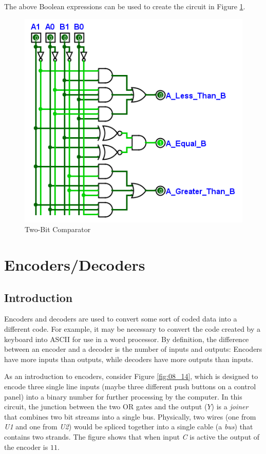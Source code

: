 The above Boolean expressions can be used to create the circuit in Figure \ref{fig:08_13}.

\begin{figure}[H]
	\centering
	\includegraphics[width=\maxwidth{.95\linewidth}]{gfx/08_13}
	\caption{Two-Bit Comparator}
	\label{fig:08_13}
\end{figure}

\section{Encoders/Decoders}
\label{CL:sec:encoders_decoders}

\subsection{Introduction}
\label{CL:subsec:introduction_to_encoders_decoders}

Encoders and decoders are used to convert some sort of coded data into a different code. For example, it may be necessary to convert the code created by a keyboard into \ac{ASCII} for use in a word processor. By definition, the difference between an encoder and a decoder is the number of inputs and outputs: Encoders have more inputs than outputs, while decoders have more outputs than inputs. 

As an introduction to encoders, consider Figure \ref{fig:08_14}, which is designed to encode three single line inputs (maybe three different push buttons on a control panel) into a binary number for further processing by the computer. In this circuit, the junction between the two \textsf{OR} gates and the output ($ Y $) is a \emph{joiner} that combines two bit streams into a single bus. Physically, two wires (one from \emph{U1} and one from \emph{U2}) would be spliced together into a single cable (a \emph{bus}) that contains two strands. The figure shows that when input \emph{C} is active the output of the encoder is $ 11 $.

